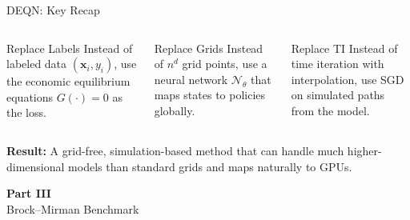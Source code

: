 \documentclass[aspectratio=169,11pt]{beamer}
\newcommand{\emphc}[1]{\textcolor{harvardcrimson}{#1}}
\newcommand{\x}{\bm{x}}
\begin{document}
\begin{frame}{DEQN: Key Recap}
\begin{columns}[T]
\begin{block}{Replace Labels}
\centering
\small
Instead of labeled data $(\x_i, y_i)$, use the economic equilibrium equations $G(\cdot) = 0$ as the loss.
\end{block}

\begin{block}{Replace Grids}
\centering
\small
Instead of $n^d$ grid points, use a neural network $\mathcal{N}_\theta$ that maps states to policies \emphc{globally}.
\end{block}

\begin{block}{Replace TI}
\centering
\small
Instead of time iteration with interpolation, use SGD on simulated paths from the model.
\end{block}
\end{columns}

\vspace{0.8em}
\begin{center}
\textbf{Result:} A grid-free, simulation-based method that can handle
much higher-dimensional models than standard grids and maps naturally to GPUs.
\end{center}
\end{frame}


\begin{frame}{}
\vfill
\begin{center}
{\Huge \textcolor{uzhblue}{\textbf{Part III}}}\\[12pt]
{\LARGE Brock--Mirman Benchmark}
\end{center}
\vfill
\end{frame}
\end{document}
